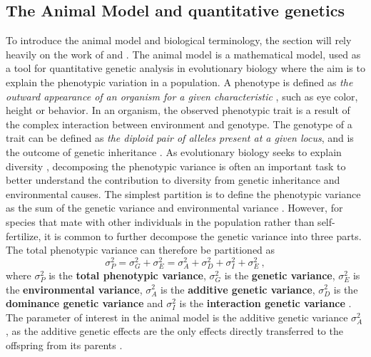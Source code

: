 \subsection{The Animal Model and quantitative genetics}
\label{sec:animalmodel}
To introduce the animal model and biological terminology, the section will rely heavily on the work of \citet{Kruuk2004} and \citet{ConnerHartl2004}. 
The animal model is a mathematical model, used as a tool for quantitative genetic analysis in evolutionary biology where the aim is to explain the phenotypic variation in a population.
A phenotype is defined as \textit{the outward appearance of an organism for a given characteristic} \citep{ConnerHartl2004}, such as eye color, height or behavior. 
In an organism, the observed phenotypic trait is a result of the complex interaction between environment and genotype. 
The genotype of a trait can be defined as \textit{the diploid pair of alleles present at a given locus}, and is the outcome of genetic inheritance \citep{ConnerHartl2004}. 
As evolutionary biology seeks to explain diversity \citep{Kruuk2004}, decomposing the phenotypic variance is often an important task to better understand the contribution to diversity from genetic inheritance and environmental causes. %
The simplest partition is to define the phenotypic variance as the sum of the genetic variance and environmental variance \citep{ConnerHartl2004}. 
However, for species that mate with other individuals in the population rather than self-fertilize, it is common to further decompose the genetic variance into three parts. 
The total phenotypic variance can therefore be partitioned as
\begin{equation}
    \sigma^2_P = \sigma^2_G + \sigma^2_E = \sigma^2_A + \sigma^2_D + \sigma^2_I + \sigma^2_E \ ,
\end{equation}
where $\sigma^2_P$ is the \textbf{total phenotypic variance}, $\sigma^2_G$ is the \textbf{genetic variance}, $\sigma^2_E$ is the \textbf{environmental variance}, $\sigma^2_A$ is the \textbf{additive genetic variance}, $\sigma^2_D$ is the \textbf{dominance genetic variance} and $\sigma^2_I$ is the \textbf{interaction genetic variance} \citep{ConnerHartl2004}.
The parameter of interest in the animal model is the additive genetic variance $\sigma^2_A$ \citep{Kruuk2004}, as the additive genetic effects are the only effects directly transferred to the offspring from its parents \citep{ConnerHartl2004}.
